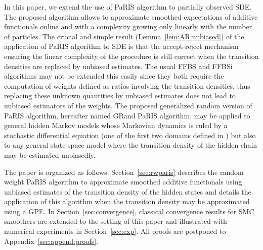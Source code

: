 \documentclass[12pt]{article}
\newcommand{\1}{\mathrm{1}}
\begin{document}
In this paper, we extend the use of  PaRIS algorithm to partially observed SDE. 
The proposed algorithm allows to approximate smoothed expectations of additive functionals online and with a complexity growing only linearly with the number of particles. The crucial and simple result (Lemma~\ref{lem:AR:unbiased}) of the application of PaRIS algorithm to SDE is that the accept-reject mechanism ensuring the linear complexity of the procedure is still correct when the transition densities are replaced by unbiased estimates. The usual FFBS and FFBSi algorithms may not be extended this easily since they both require the computation of weights defined as ratios involving the transition densities, thus replacing these unknown quantities by unbiased estimates does not lead to unbiased estimators of the weights. The proposed generalized random version of PaRIS algorithm, hereafter named GRand PaRIS algorithm, may be applied to general hidden Markov models whose Markovian dynamics is ruled by a stochastic differential equation (one of the first two domains defined in \cite{beskos:papaspiliopoulos:roberts:fearnhead:2006}) but also to any general state space model where the transition density of the hidden chain may be estimated unbiasedly.

The paper is organized as follows. Section~\ref{sec:rwparis} describes the random weight PaRIS algorithm to approximate smoothed additive functionals using unbiased estimates of the transition density of the hidden states and details the application of this algorithm when the transition density may be approximated using a GPE. 
In Section~\ref{sec:convergence}, classical convergence results for SMC smoothers are extended to the setting of this paper and illustrated with numerical experiments in Section~\ref{sec:exp}. 
All proofs are postponed to Appendix~\ref{sec:append:proofs}.
\end{document}
